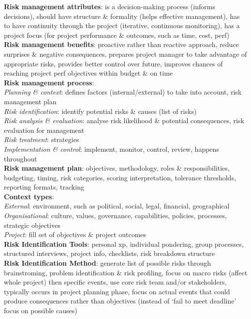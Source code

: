 \documentclass[a4paper]{article}
\begin{document}
\begin{multicols}{3}
        \textbf{Risk management attributes}: is a decision-making process (informs decisions), should have structure \& formality (helps effective management), has to have continuity through the project (iterative, continuous monitoring), has a project focus (for project performance \& outcomes, such as time, cost, perf)\\
        \textbf{Risk management benefits}: proactive rather than reactive approach, reduce surprises \& negative consequences, prepares project manager to take advantage of appropriate risks, provides better control over future, improves chances of reaching project perf objectives within budget \& on time\\
        \textbf{Risk management process}:\\
        \textit{Planning \& context}: defines factors (internal/external) to take into account, risk management plan\\
        \textit{Risk identification}: identify potential risks \& causes (list of risks)\\
        \textit{Risk analysis \& evaluation}: analyse risk likelihood \& potential consequences, risk evaluation for management\\
        \textit{Risk treatment}: strategies\\
        \textit{Implementation \& control}: implement, monitor, control, review, happens throughout\\
        \textbf{Risk management plan}: objectives, methodology, roles \& responsibilities, budgeting, timing, risk categories, scoring interpretation, tolerance thresholds, reporting formats, tracking\\
        \textbf{Context types}:\\
        \textit{External}: environment, such as political, social, legal, financial, geographical\\
        \textit{Organisational}: culture, values, governance, capabilities, policies, processes, strategic objectives\\
        \textit{Project}: fill set of objectives \& project outcomes\\
        \textbf{Risk Identification Tools}: personal xp, individual pondering, group processes, structured interviews, project info, checklists, risk breakdown structure\\
        \textbf{Risk Identification Method}: generate list of possible risks through brainstroming, problem identification \& risk profiling, focus on macro risks (affect whole project) then specific events, use core risk team and/or stakeholders, typically occurs in project planning phase, focus on actual events that could produce consequences rather than objectives (instead of `fail to meet deadline' focus on possible causes)\\

\end{multicols}
\end{document}
